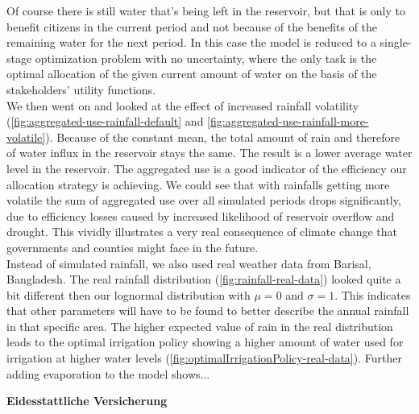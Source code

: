 \documentclass[12pt, a4paper, oneside]{article}
\begin{document}
Of course there is still water that's being left in the reservoir, but that is only to benefit citizens in the current period and not because of the benefits of the remaining water for the next period.
In this case the model is reduced to a single-stage optimization problem with no uncertainty, where the only task is the optimal allocation of the given current amount of water on the basis of the stakeholders' utility functions.
\\
We then went on and looked at the effect of increased rainfall volatility (\ref{fig:aggregated-use-rainfall-default} and \ref{fig:aggregated-use-rainfall-more-volatile}).
Because of the constant mean, the total amount of rain and therefore of water influx in the reservoir stays the same.
The result is a lower average water level in the reservoir.
The aggregated use is a good indicator of the efficiency our allocation strategy is achieving.
We could see that with rainfalls getting more volatile the sum of aggregated use over all simulated periods drops significantly, due to efficiency losses caused by increased likelihood of reservoir overflow and drought. %
This vividly illustrates a very real consequence of climate change that governments and counties might face in the future.
\\
Instead of simulated rainfall, we also used real weather data from Barisal, Bangladesh. 
The real rainfall distribution (\ref{fig:rainfall-real-data}) looked quite a bit different then our lognormal distribution with $\mu=0$ and $\sigma=1$.
This indicates that other parameters will have to be found to better describe the annual rainfall in that specific area.
The higher expected value of rain in the real distribution leads to the optimal irrigation policy showing a higher amount of water used for irrigation at higher water levels (\ref{fig:optimalIrrigationPolicy-real-data}).
Further adding evaporation to the model shows...


\clearpage
\printbibliography

\newpage






\pagestyle{empty} 
\begingroup
\begin{center}
	\large
	\textbf{Eidesstattliche Versicherung}
\end{center}
\end{document}
